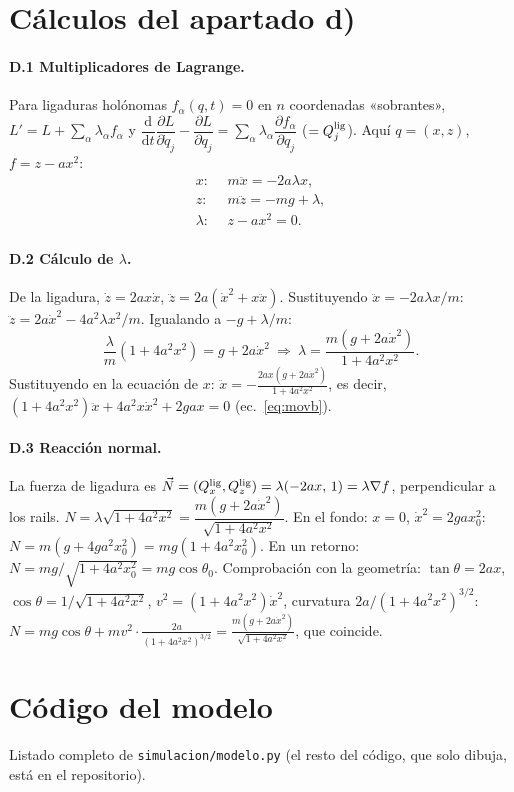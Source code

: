 \documentclass[11pt,a4paper]{article}
\newcommand{\dd}{\mathrm{d}}
\newcommand{\pd}[2]{\dfrac{\partial #1}{\partial #2}}
\newcommand{\ddt}[1]{\dfrac{\dd #1}{\dd t}}
\begin{document}
\section{Cálculos del apartado d)}\label{app:d}
\paragraph{D.1 Multiplicadores de Lagrange.}
Para ligaduras holónomas $f_\alpha(q,t)=0$ en $n$ coordenadas «sobrantes», $L'=L+\sum_\alpha\lambda_\alpha f_\alpha$ y
$\ddt{}\pd{L}{\dot q_j}-\pd{L}{q_j}=\sum_\alpha\lambda_\alpha\pd{f_\alpha}{q_j}$ ($=Q^{\rm lig}_j$). Aquí $q=(x,z)$, $f=z-ax^2$:
\begin{align}
 x:&\ \ m\ddot x=-2a\lambda x,\\
 z:&\ \ m\ddot z=-mg+\lambda,\\
 \lambda:&\ \ z-ax^2=0 .
\end{align}

\paragraph{D.2 Cálculo de $\lambda$.}
De la ligadura, $\dot z=2ax\dot x$, $\ddot z=2a(\dot x^2+x\ddot x)$. Sustituyendo $\ddot x=-2a\lambda x/m$:
$\ddot z=2a\dot x^2-4a^2\lambda x^2/m$. Igualando a $-g+\lambda/m$:
\begin{equation}
 \frac{\lambda}{m}\left(1+4a^2x^2\right)=g+2a\dot x^2\ \Rightarrow\ \lambda=\frac{m(g+2a\dot x^2)}{1+4a^2x^2}.
\end{equation}
Sustituyendo en la ecuación de $x$: $\ddot x=-\frac{2ax(g+2a\dot x^2)}{1+4a^2x^2}$, es decir, $(1+4a^2x^2)\ddot x+4a^2x\dot x^2+2gax=0$ (ec.~\eqref{eq:movb}).

\paragraph{D.3 Reacción normal.}
La fuerza de ligadura es $\vec N=(Q^{\rm lig}_x,Q^{\rm lig}_z)=\lambda(-2ax,\,1)=\lambda\nabla f$, perpendicular a los rails. $N=\lambda\sqrt{1+4a^2x^2}=\dfrac{m(g+2a\dot x^2)}{\sqrt{1+4a^2x^2}}$.
En el fondo: $x=0$, $\dot x^2=2gax_0^2$: $N=m(g+4ga^2x_0^2)=mg(1+4a^2x_0^2)$. En un retorno: $N=mg/\sqrt{1+4a^2x_0^2}=mg\cos\theta_0$.
Comprobación con la geometría: $\tan\theta=2ax$, $\cos\theta=1/\sqrt{1+4a^2x^2}$, $v^2=(1+4a^2x^2)\dot x^2$, curvatura $2a/(1+4a^2x^2)^{3/2}$:
$N=mg\cos\theta+mv^2\cdot\frac{2a}{(1+4a^2x^2)^{3/2}}=\frac{m(g+2a\dot x^2)}{\sqrt{1+4a^2x^2}}$, que coincide.

\section{Código del modelo}\label{app:codigo}
Listado completo de \texttt{simulacion/modelo.py} (el resto del código, que solo dibuja, está en el repositorio).

\end{document}
